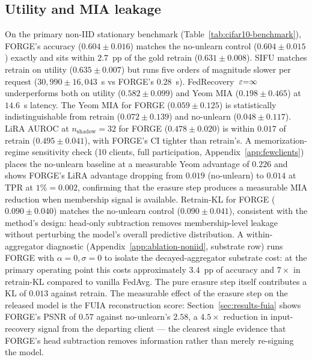 \subsection{Utility and MIA leakage}
\label{sec:results-utility}

On the primary non-IID stationary benchmark (Table~\ref{tab:cifar10-benchmark}),
FORGE's accuracy ($0.604 \pm 0.016$) matches the no-unlearn control
($0.604 \pm 0.015$) exactly and sits within $2.7$~pp of the gold retrain
($0.631 \pm 0.008$). SIFU matches retrain on utility ($0.635 \pm 0.007$) but
runs five orders of magnitude slower per request ($30{,}990 \pm 16{,}043$~s vs
FORGE's $0.28$~s). FedRecovery~$\varepsilon{=}\infty$ underperforms both on utility
($0.582 \pm 0.099$) and Yeom MIA ($0.198 \pm 0.465$) at $14.6$~s latency. The
Yeom MIA for FORGE ($0.059 \pm 0.125$) is statistically indistinguishable from
retrain ($0.072 \pm 0.139$) and no-unlearn ($0.048 \pm 0.117$). LiRA AUROC at $n_\mathrm{shadow}{=}32$ for FORGE
($0.478 \pm 0.020$) is within $0.017$ of retrain ($0.495 \pm 0.041$), with
FORGE's CI tighter than retrain's. A memorization-regime sensitivity check
(10 clients, full participation, Appendix~\ref{app:fewclients}) places the
no-unlearn baseline at a measurable Yeom advantage of $0.226$ and shows
FORGE's LiRA advantage dropping from $0.019$ (no-unlearn) to $0.014$ at TPR at
$1\%{=}0.002$, confirming that the erasure step produces a measurable MIA
reduction when membership signal is available. Retrain-KL for FORGE ($0.090 \pm 0.040$)
matches the no-unlearn control ($0.090 \pm 0.041$), consistent with the method's
design: head-only subtraction removes membership-level leakage without perturbing
the model's overall predictive distribution. A within-aggregator diagnostic
(Appendix~\ref{app:ablation-noniid}, substrate row) runs FORGE with
$\alpha{=}0, \sigma{=}0$ to isolate the decayed-aggregator substrate cost: at
the primary operating point this costs approximately $3.4$~pp of accuracy and
$7\times$ in retrain-KL compared to vanilla FedAvg. The pure erasure step itself
contributes a KL of $0.013$ against retrain. The measurable effect of the
erasure step on the released model is the FUIA reconstruction score:
Section~\ref{sec:results-fuia} shows FORGE's PSNR of $0.57$ against no-unlearn's
$2.58$, a $4.5\times$ reduction in input-recovery signal from the departing
client — the clearest single evidence that FORGE's head subtraction removes
information rather than merely re-signing the model.

